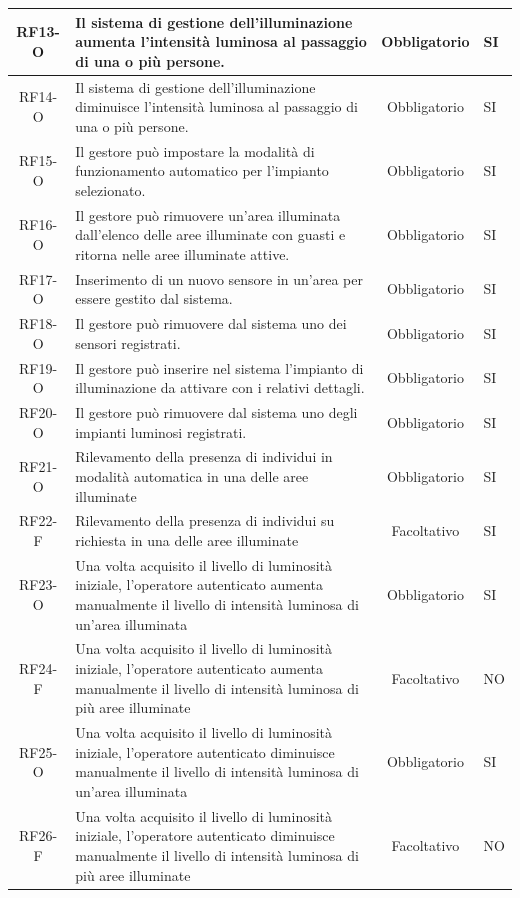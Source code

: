 \documentclass[a4paper, 11pt]{article}
\begin{document}
\begin{longtable}{|c|p{7cm}|c|p{4cm}|}
    \hline
    RF13-O & Il sistema di gestione dell'illuminazione aumenta l'intensità luminosa al passaggio di una o più persone. & Obbligatorio & SI \\
    \hline
    RF14-O & Il sistema di gestione dell'illuminazione diminuisce l'intensità luminosa al passaggio di una o più persone. & Obbligatorio & SI \\
    \hline
    RF15-O & Il gestore può impostare la modalità di funzionamento automatico per l'impianto selezionato. & Obbligatorio & SI \\
    \hline
    RF16-O & Il gestore può rimuovere un'area illuminata dall'elenco delle aree illuminate con guasti e ritorna nelle aree illuminate attive. & Obbligatorio & SI \\
    \hline
    RF17-O & Inserimento di un nuovo sensore in un'area per essere gestito dal sistema. & Obbligatorio & SI \\
    \hline
    RF18-O & Il gestore può rimuovere dal sistema uno dei sensori registrati. & Obbligatorio & SI\\
    \hline
    RF19-O & Il gestore può inserire nel sistema l'impianto di illuminazione da attivare con i relativi dettagli. & Obbligatorio & SI\\
    \hline
    RF20-O & Il gestore può rimuovere dal sistema uno degli impianti luminosi registrati. & Obbligatorio & SI \\
    \hline
    RF21-O & Rilevamento della presenza di individui in modalità automatica in una delle aree illuminate & Obbligatorio & SI \\
    \hline
    RF22-F & Rilevamento della presenza di individui su richiesta in una delle aree illuminate & Facoltativo & SI \\
    \hline
    RF23-O & Una volta acquisito il livello di luminosità iniziale, l'operatore autenticato aumenta manualmente il livello di intensità luminosa di un'area illuminata & Obbligatorio & SI \\
    \hline
    RF24-F & Una volta acquisito il livello di luminosità iniziale, l'operatore autenticato aumenta manualmente il livello di intensità luminosa di più aree illuminate & Facoltativo & NO \\
    \hline
    RF25-O & Una volta acquisito il livello di luminosità iniziale, l'operatore autenticato diminuisce manualmente il livello di intensità luminosa di un'area illuminata & Obbligatorio & SI \\
    \hline
    RF26-F & Una volta acquisito il livello di luminosità iniziale, l'operatore autenticato diminuisce manualmente il livello di intensità luminosa di più aree illuminate & Facoltativo & NO \\

\end{longtable}
\end{document}
